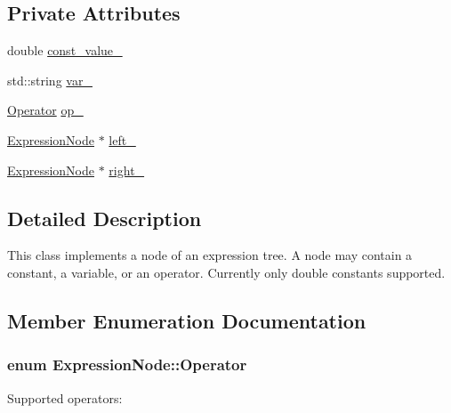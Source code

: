 \subsection*{Private Attributes}
\begin{DoxyCompactItemize}
\item 
double \hyperlink{classExpressionNode_a0aa8b2c1e9bcbdd5889283e318b36df8}{const\+\_\+value\+\_\+}
\item 
std\+::string \hyperlink{classExpressionNode_aef84ffa8692cd45724587997b4b6bfc2}{var\+\_\+}
\item 
\hyperlink{classExpressionNode_a7735465f9aac516880869e4a630d2569}{Operator} \hyperlink{classExpressionNode_aa55e5451dc4ea9ed725352a728512eff}{op\+\_\+}
\item 
\hyperlink{classExpressionNode}{Expression\+Node} $\ast$ \hyperlink{classExpressionNode_a5f5dc68940e065fb3ae3cba23c3e1f44}{left\+\_\+}
\item 
\hyperlink{classExpressionNode}{Expression\+Node} $\ast$ \hyperlink{classExpressionNode_a5116bfa5453532ccc2b00f373da4f245}{right\+\_\+}
\end{DoxyCompactItemize}


\subsection{Detailed Description}
This class implements a node of an expression tree. A node may contain a constant, a variable, or an operator. Currently only double constants supported. 

\subsection{Member Enumeration Documentation}
\hypertarget{classExpressionNode_a7735465f9aac516880869e4a630d2569}{}
\subsubsection[{Operator}]{\setlength{\rightskip}{0pt plus 5cm}enum {\bf Expression\+Node\+::\+Operator}}\label{classExpressionNode_a7735465f9aac516880869e4a630d2569}
Supported operators\+:


